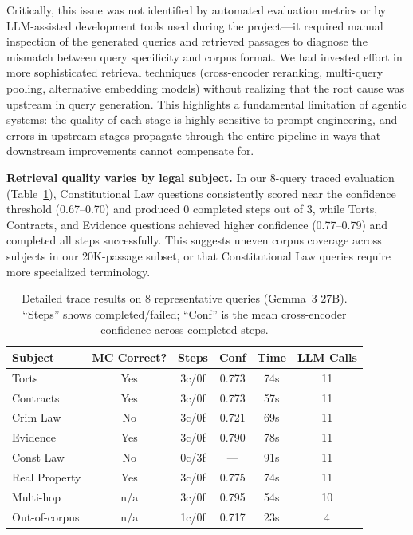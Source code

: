 \documentclass{article}
\begin{document}
Critically, this issue was not identified by automated evaluation metrics or by LLM-assisted development tools used during the project---it required manual inspection of the generated queries and retrieved passages to diagnose the mismatch between query specificity and corpus format. We had invested effort in more sophisticated retrieval techniques (cross-encoder reranking, multi-query pooling, alternative embedding models) without realizing that the root cause was upstream in query generation. This highlights a fundamental limitation of agentic systems: the quality of each stage is highly sensitive to prompt engineering, and errors in upstream stages propagate through the entire pipeline in ways that downstream improvements cannot compensate for.

\textbf{Retrieval quality varies by legal subject.}
In our 8-query traced evaluation (Table~\ref{tab:trace}), Constitutional Law questions consistently scored near the confidence threshold (0.67--0.70) and produced 0 completed steps out of 3, while Torts, Contracts, and Evidence questions achieved higher confidence (0.77--0.79) and completed all steps successfully. This suggests uneven corpus coverage across subjects in our 20K-passage subset, or that Constitutional Law queries require more specialized terminology.

\begin{table}[t]
\centering
\caption{Detailed trace results on 8 representative queries (Gemma~3 27B). ``Steps'' shows completed/failed; ``Conf'' is the mean cross-encoder confidence across completed steps.}
\label{tab:trace}
\begin{tabular}{lccccc}
\toprule
\textbf{Subject} & \textbf{MC Correct?} & \textbf{Steps} & \textbf{Conf} & \textbf{Time} & \textbf{LLM Calls} \\
\midrule
Torts & Yes & 3c/0f & 0.773 & 74s & 11 \\
Contracts & Yes & 3c/0f & 0.773 & 57s & 11 \\
Crim Law & No & 3c/0f & 0.721 & 69s & 11 \\
Evidence & Yes & 3c/0f & 0.790 & 78s & 11 \\
Const Law & No & 0c/3f & --- & 91s & 11 \\
Real Property & Yes & 3c/0f & 0.775 & 74s & 11 \\
Multi-hop & n/a & 3c/0f & 0.795 & 54s & 10 \\
Out-of-corpus & n/a & 1c/0f & 0.717 & 23s & 4 \\
\bottomrule
\end{tabular}
\end{table}
\end{document}
